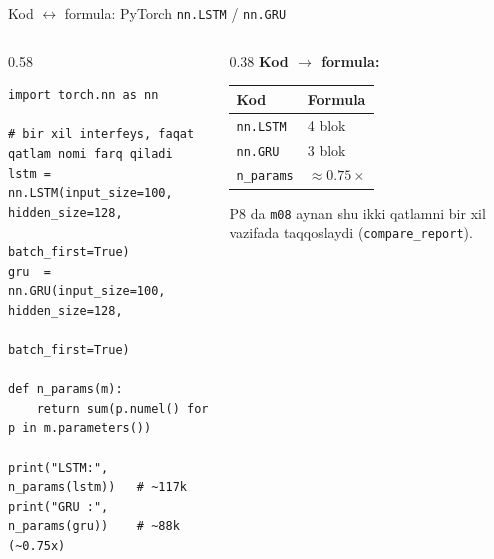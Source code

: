 \documentclass[aspectratio=169,11pt]{beamer}
\begin{document}
\begin{frame}[fragile]{Kod $\leftrightarrow$ formula: PyTorch \texttt{nn.LSTM} / \texttt{nn.GRU}}
  \begin{columns}[T]
    \begin{column}{0.58\textwidth}
\begin{lstlisting}
import torch.nn as nn

# bir xil interfeys, faqat qatlam nomi farq qiladi
lstm = nn.LSTM(input_size=100, hidden_size=128,
               batch_first=True)
gru  = nn.GRU(input_size=100, hidden_size=128,
              batch_first=True)

def n_params(m):
    return sum(p.numel() for p in m.parameters())

print("LSTM:", n_params(lstm))   # ~117k
print("GRU :", n_params(gru))    # ~88k  (~0.75x)
\end{lstlisting}
    \end{column}
    \begin{column}{0.38\textwidth}
      \textbf{Kod $\to$ formula:}\\[3pt]
      \footnotesize
      \begin{tabular}{p{1.7cm}p{1.9cm}}
        \toprule
        Kod & Formula \\
        \midrule
        \texttt{nn.LSTM} & 4 blok \\
        \texttt{nn.GRU} & 3 blok \\
        \texttt{n\_params} & $\approx 0.75\times$ \\
        \bottomrule
      \end{tabular}
      \vspace{4pt}
      \begin{tcolorbox}[okbox,top=2pt,bottom=2pt]
        \footnotesize
        P8 da \texttt{m08} aynan shu ikki qatlamni bir xil vazifada taqqoslaydi
        (\texttt{compare\_report}).
      \end{tcolorbox}
    \end{column}
  \end{columns}
\end{frame}
\end{document}
